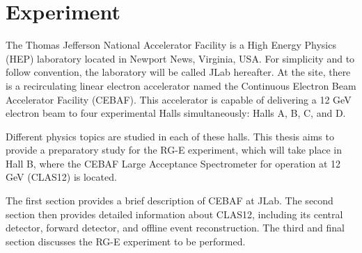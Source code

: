 \section{Experiment}
\label{11::experiment}
    The Thomas Jefferson National Accelerator Facility is a High Energy Physics (HEP) laboratory located in Newport News, Virginia, USA.
    For simplicity and to follow convention, the laboratory will be called JLab hereafter.
    At the site, there is a recirculating linear electron accelerator named the Continuous Electron Beam Accelerator Facility (CEBAF).
    This accelerator is capable of delivering a 12 GeV electron beam to four experimental Halls simultaneously: Halls A, B, C, and D.

    Different physics topics are studied in each of these halls.
    This thesis aims to provide a preparatory study for the RG-E experiment, which will take place in Hall B, where the CEBAF Large Acceptance Spectrometer for operation at 12 GeV (CLAS12) is located.

    The first section provides a brief description of CEBAF at JLab.
    The second section then provides detailed information about CLAS12, including its central detector, forward detector, and offline event reconstruction.
    The third and final section discusses the RG-E experiment to be performed.

    
    
    

